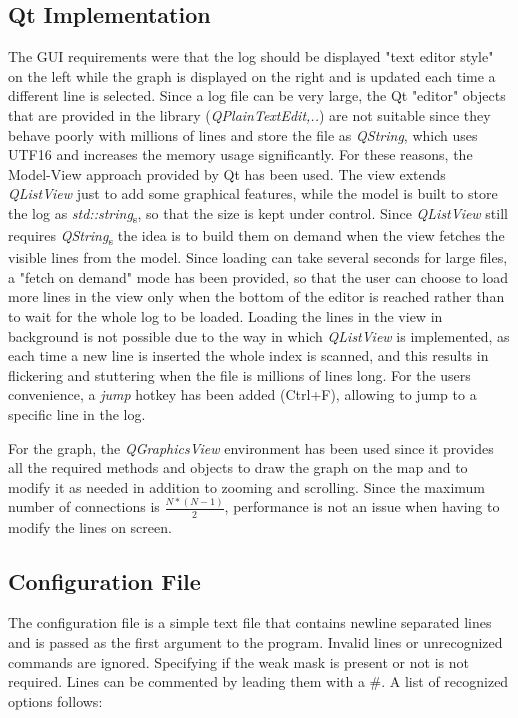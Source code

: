 \subsection{Qt Implementation}
The GUI requirements were that the log should be displayed "text editor style" on the left while the graph is displayed on the right and is updated each time a different line is selected. Since a log file can be very large, the Qt "editor" objects that are provided in the library (\textit{QPlainTextEdit,..}) are not suitable since they behave poorly with millions of lines and store the file as \textit{QString}, which uses UTF16 and increases the memory usage significantly. For these reasons, the Model-View approach provided by Qt has been used. The view extends \textit{QListView} just to add some graphical features, while the model is built to store the log as \textit{std::string}\textsubscript{s}, so that the size is kept under control. Since \textit{QListView} still requires \textit{QString}\textsubscript{s} the idea is to build them on demand when the view fetches the visible lines from the model.
Since loading can take several seconds for large files, a "fetch on demand" mode has been provided, so that the user can choose to load more lines in the view only when the bottom of the editor is reached rather than to wait for the whole log to be loaded. Loading the lines in the view in background is not possible due to the way in which \textit{QListView} is implemented, as each time a new line is inserted the whole index is scanned, and this results in flickering and stuttering when the file is millions of lines long. For the users convenience, a \textit{jump} hotkey has been added (Ctrl+F), allowing to jump to a specific line in the log.

For the graph, the \textit{QGraphicsView} environment has been used since it provides all the required methods and objects to draw the graph on the map and to modify it as needed in addition to zooming and scrolling. Since the maximum number of connections is $\frac{N*(N-1)}{2}$, performance is not an issue when having to modify the lines on screen.

\subsection{Configuration File}
The configuration file is a simple text file that contains newline separated lines and is passed as the first argument to the program. Invalid lines or unrecognized commands are ignored. Specifying if the weak mask is present or not is not required. Lines can be commented by leading them with a \#. A list of recognized options follows:

